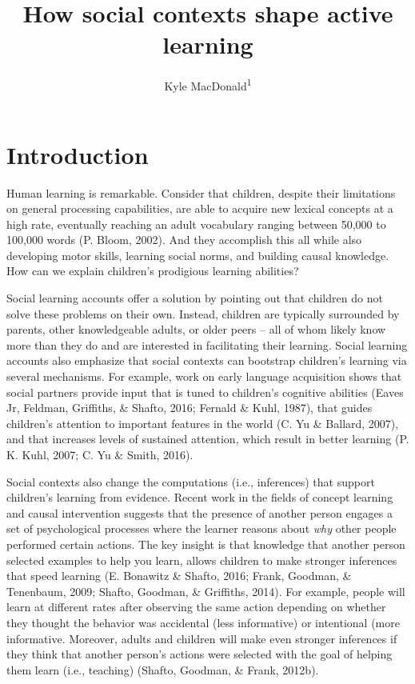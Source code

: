 \documentclass[english,floatsintext,man]{apa6}
\title{How social contexts shape active learning}
\author{Kyle MacDonald\textsuperscript{1}}
\affiliation{
    \vspace{0.5cm}
          \textsuperscript{1} Stanford University  }
\theoremstyle{definition}
\theoremstyle{definition}
\theoremstyle{definition}
\theoremstyle{remark}
\begin{document}
\maketitle

\setcounter{secnumdepth}{0}



\section{Introduction}\label{introduction}

Human learning is remarkable. Consider that children, despite their
limitations on general processing capabilities, are able to acquire new
lexical concepts at a high rate, eventually reaching an adult vocabulary
ranging between 50,000 to 100,000 words (P. Bloom, 2002). And they
accomplish this all while also developing motor skills, learning social
norms, and building causal knowledge. How can we explain children's
prodigious learning abilities?

Social learning accounts offer a solution by pointing out that children
do not solve these problems on their own. Instead, children are
typically surrounded by parents, other knowledgeable adults, or older
peers -- all of whom likely know more than they do and are interested in
facilitating their learning. Social learning accounts also emphasize
that social contexts can bootstrap children's learning via several
mechanisms. For example, work on early language acquisition shows that
social partners provide input that is tuned to children's cognitive
abilities (Eaves Jr, Feldman, Griffiths, \& Shafto, 2016; Fernald \&
Kuhl, 1987), that guides children's attention to important features in
the world (C. Yu \& Ballard, 2007), and that increases levels of
sustained attention, which result in better learning (P. K. Kuhl, 2007;
C. Yu \& Smith, 2016).

Social contexts also change the computations (i.e., inferences) that
support children's learning from evidence. Recent work in the fields of
concept learning and causal intervention suggests that the presence of
another person engages a set of psychological processes where the
learner reasons about \emph{why} other people performed certain actions.
The key insight is that knowledge that another person selected examples
to help you learn, allows children to make stronger inferences that
speed learning (E. Bonawitz \& Shafto, 2016; Frank, Goodman, \&
Tenenbaum, 2009; Shafto, Goodman, \& Griffiths, 2014). For example,
people will learn at different rates after observing the same action
depending on whether they thought the behavior was accidental (less
informative) or intentional (more informative. Moreover, adults and
children will make even stronger inferences if they think that another
person's actions were selected with the goal of helping them learn
(i.e., teaching) (Shafto, Goodman, \& Frank, 2012b).
\end{document}
